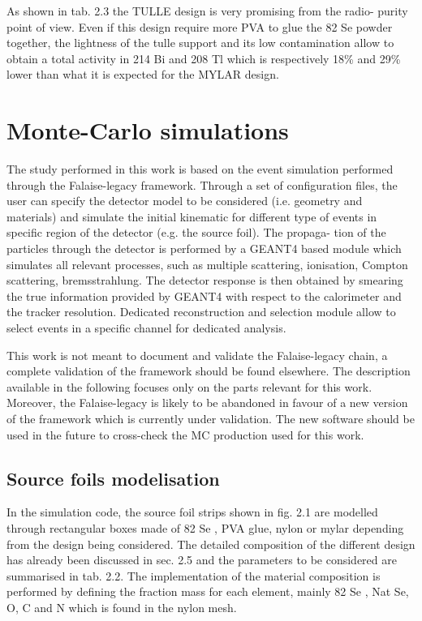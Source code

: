 \documentclass[main.tex]{subfiles}
\begin{document}
\bigskip


\NI As shown in tab. 2.3 the TULLE design is very promising from the radio- purity point of view. Even if this design require more PVA to glue the 82 Se powder together, the lightness of the tulle support and its low contamination allow to obtain a total activity in 214 Bi and 208 Tl which is respectively 18\% and 29\% lower than what it is expected for the MYLAR design.


\section{Monte-Carlo simulations}


\NI The study performed in this work is based on the event simulation performed through the Falaise-legacy framework. Through a set of configuration files, the user can specify the detector model to be considered (i.e. geometry and materials) and simulate the initial kinematic for different type of events in specific region of the detector (e.g. the source foil). The propaga- tion of the particles through the detector is performed by a GEANT4 based module which simulates all relevant processes, such as multiple scattering, ionisation, Compton scattering, bremsstrahlung. The detector response is then obtained by smearing the true information provided by GEANT4 with respect to the calorimeter and the tracker resolution. Dedicated reconstruction and selection module allow to select events in a specific channel for dedicated analysis.


\bigskip


\NI This work is not meant to document and validate the Falaise-legacy chain, a complete validation of the framework should be found elsewhere. The description available in the following focuses only on the parts relevant for this work. Moreover, the Falaise-legacy is likely to be abandoned in favour of a new version of the framework which is currently under validation. The new software should be used in the future to cross-check the MC production used for this work.


\subsection{Source foils modelisation}


\NI In the simulation code, the source foil strips shown in fig. 2.1 are modelled through rectangular boxes made of 82 Se , PVA glue, nylon or mylar depending from the design being considered. The detailed composition of the different design has already been discussed in sec. 2.5 and the parameters to be considered are summarised in tab. 2.2. The implementation of the material composition is performed by defining the fraction mass for each element, mainly 82 Se , Nat Se, O, C and N which is found in the nylon mesh.
\end{document}
